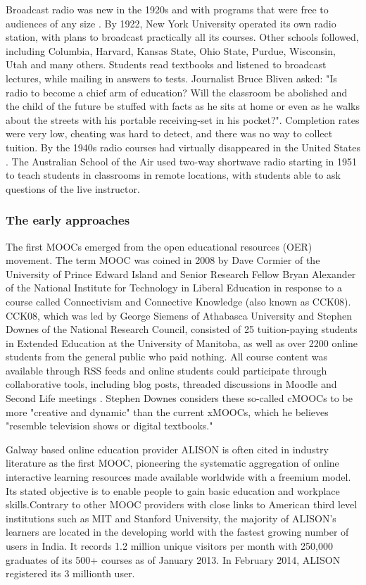 Broadcast radio was new in the 1920s and with programs that were free to
audiences of any size \citep{listening_in}. By 1922, New York University operated its own radio
station, with plans to broadcast practically all its courses. Other schools
followed, including Columbia, Harvard, Kansas State, Ohio State, Purdue,
Wisconsin, Utah and many others. Students read textbooks and listened to
broadcast lectures, while mailing in answers to tests. Journalist Bruce Bliven
asked: "Is radio to become a chief arm of education? Will the classroom be
abolished and the child of the future be stuffed with facts as he sits at home
or even as he walks about the streets with his portable receiving-set in his
pocket?". Completion rates were very low, cheating was hard to detect, and
there was no way to collect tuition. By the 1940s radio courses had virtually
disappeared in the United States \citep{before_mooc}. The Australian School of the Air used
two-way shortwave radio starting in 1951 to teach students in classrooms in
remote locations, with students able to ask questions of the live instructor.

\subsubsection{The early approaches}
The first MOOCs emerged from the open educational resources (OER) movement. The
term MOOC was coined in 2008 by Dave Cormier of the University of Prince Edward
Island and Senior Research Fellow Bryan Alexander of the National Institute for
Technology in Liberal Education in response to a course called Connectivism and
Connective Knowledge (also known as CCK08). CCK08, which was led by George
Siemens of Athabasca University and Stephen Downes of the National Research
Council, consisted of 25 tuition-paying students in Extended Education at the
University of Manitoba, as well as over 2200 online students from the general
public who paid nothing. All course content was available through RSS feeds
and online students could participate through collaborative tools, including
blog posts, threaded discussions in Moodle and Second Life meetings \citep{cck08}.
Stephen Downes considers these so-called cMOOCs to be more "creative and
dynamic" than the current xMOOCs, which he believes "resemble television shows
or digital textbooks." \citep{courses_lack_of_creativity}

Galway based online education provider ALISON is often cited in industry
literature as the first MOOC, pioneering the systematic aggregation of online
interactive learning resources made available worldwide with a freemium
model. Its stated objective is to enable people to gain basic
education and workplace skills.Contrary to other MOOC providers with
close links to American third level institutions such as MIT and Stanford
University, the majority of ALISON's learners are located in the developing
world with the fastest growing number of users in India. It records 1.2
million unique visitors per month with 250,000 graduates of its 500+ courses as
of January 2013. In February 2014, ALISON registered its 3 millionth user.

